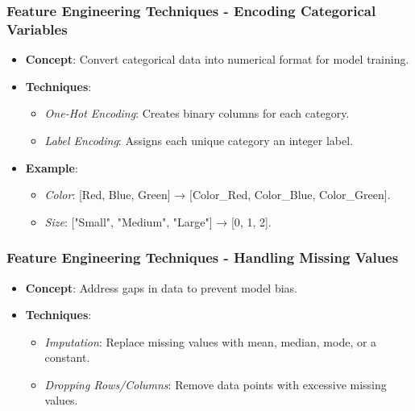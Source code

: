 \documentclass[aspectratio=169]{beamer}
\begin{document}
\begin{frame}[fragile]
    \frametitle{Feature Engineering Techniques - Encoding Categorical Variables}
    \begin{itemize}
        \item \textbf{Concept}: Convert categorical data into numerical format for model training.
        \item \textbf{Techniques}:
        \begin{itemize}
            \item \textit{One-Hot Encoding}: Creates binary columns for each category.
            \item \textit{Label Encoding}: Assigns each unique category an integer label.
        \end{itemize}
        \item \textbf{Example}:
        \begin{itemize}
            \item \textit{Color}: [Red, Blue, Green] → [Color\_Red, Color\_Blue, Color\_Green].
            \item \textit{Size}: ["Small", "Medium", "Large"] → [0, 1, 2].
        \end{itemize}
    \end{itemize}
\end{frame}

\begin{frame}[fragile]
    \frametitle{Feature Engineering Techniques - Handling Missing Values}
    \begin{itemize}
        \item \textbf{Concept}: Address gaps in data to prevent model bias.
        \item \textbf{Techniques}:
        \begin{itemize}
            \item \textit{Imputation}: Replace missing values with mean, median, mode, or a constant.
            \item \textit{Dropping Rows/Columns}: Remove data points with excessive missing values.
        \end{itemize}
    \end{itemize}
\end{frame}
\end{document}
